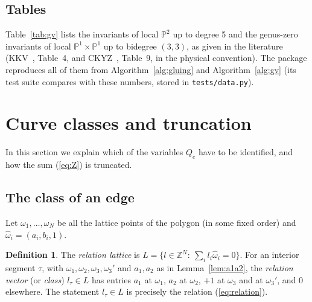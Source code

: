 \documentclass[11pt]{article}
\theoremstyle{plain}
\theoremstyle{definition}
\newtheorem{definition}[theorem]{Definition}
\theoremstyle{remark}
\newcommand{\Z}{\mathbb{Z}}
\newcommand{\PP}{\mathbb{P}}
\newcommand{\hatw}{\widehat{\omega}}
\begin{document}
\subsection{Tables}

Table~\ref{tab:gv} lists the invariants of local $\PP^2$ up to degree 5 and the genus-zero
invariants of local $\PP^1\times\PP^1$ up to bidegree $(3,3)$, as given in the literature
(KKV~\cite{KKV}, Table~4, and CKYZ~\cite{CKYZ}, Table~9, in the physical convention). The package
reproduces all of them from Algorithm~\ref{alg:gluing} and Algorithm~\ref{alg:gv} (its test suite
compares with these numbers, stored in \texttt{tests/data.py}).

\begin{table}[ht]
\centering

\caption{(Generated from \texttt{tests/data.py}.) Left: $n^g_d$ for local $\PP^2$, $d\le5$,
all genera (all $n^g_d$ not shown vanish, and the top genus $g=(d-1)(d-2)/2$ has
$n^g_d=(-1)^{d(d+3)/2}\big(\tfrac{d(d+3)}2+1\big)$, e.g.\ $n^6_5=21$). Right: $n^0_{(d_B,d_F)}$ for local
$\PP^1\times\PP^1$, symmetric under $d_B\leftrightarrow d_F$.}
\label{tab:gv}
\end{table}

\section{Curve classes and truncation}\label{sec:classes}

In this section we explain which of the variables $Q_e$ have to be identified, and how the sum
(\ref{eq:Z}) is truncated.


\subsection{The class of an edge}

Let $\omega_1,\ldots,\omega_N$ be all the lattice points of the polygon (in some fixed order) and
$\hatw_i=(a_i,b_i,1)$.

\begin{definition}
The \textit{relation lattice} is $L=\{l\in\Z^N:\ \sum_il_i\hatw_i=0\}$. For an interior segment
$\tau$, with $\omega_1,\omega_2,\omega_3,\omega_3'$ and $a_1,a_2$ as in Lemma~\ref{lem:a1a2}, the
\textit{relation vector} (or \textit{class}) $l_\tau\in L$ has entries $a_1$ at $\omega_1$, $a_2$ at
$\omega_2$, $+1$ at $\omega_3$ and at $\omega_3'$, and $0$ elsewhere. The statement $l_\tau\in L$ is
precisely the relation (\ref{eq:relation}).
\end{definition}
\end{document}
